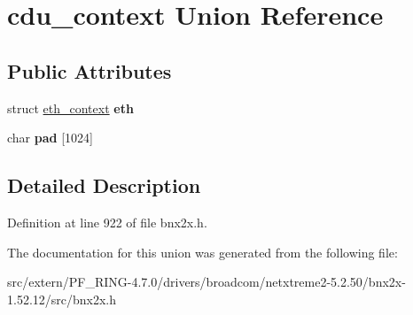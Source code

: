 \hypertarget{unioncdu__context}{
\section{cdu\_\-context Union Reference}
\label{unioncdu__context}
}
\subsection*{Public Attributes}
\begin{DoxyCompactItemize}
\item 
\hypertarget{unioncdu__context_a7b4c83228fde21d4f9e7a3d681fe72c0}{
struct \hyperlink{structeth__context}{eth\_\-context} {\bfseries eth}}
\label{unioncdu__context_a7b4c83228fde21d4f9e7a3d681fe72c0}

\item 
\hypertarget{unioncdu__context_a36aa94054a7fb92a30aaa5312d7d271d}{
char {\bfseries pad} \mbox{[}1024\mbox{]}}
\label{unioncdu__context_a36aa94054a7fb92a30aaa5312d7d271d}

\end{DoxyCompactItemize}


\subsection{Detailed Description}


Definition at line 922 of file bnx2x.h.



The documentation for this union was generated from the following file:\begin{DoxyCompactItemize}
\item 
src/extern/PF\_\-RING-\/4.7.0/drivers/broadcom/netxtreme2-\/5.2.50/bnx2x-\/1.52.12/src/bnx2x.h\end{DoxyCompactItemize}

